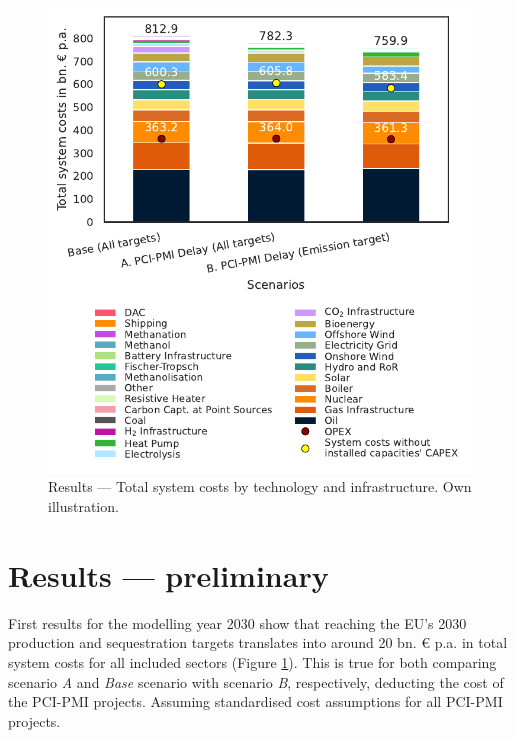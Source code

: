 \documentclass[final,5p,times,twocolumn]{elsarticle}
\begin{document}
\begin{figure}[!b]
  \centering
  \includegraphics[width=\linewidth]{system_costs}
  \caption{Results --- Total system costs by technology and infrastructure. Own illustration.}
  \label{fig:system_costs}
\end{figure}

\section{Results --- preliminary}
\label{sec:results}

First results for the modelling year 2030 show that reaching the EU's 2030  production and  sequestration targets translates into around 20 bn. \euro{} p.a. in total system costs for all included sectors (Figure \ref{fig:system_costs}). This is true for both comparing scenario \textit{A} and \textit{Base} scenario with scenario \textit{B}, respectively, deducting the cost of the PCI-PMI projects. Assuming standardised cost assumptions for all PCI-PMI projects. 
\end{document}
